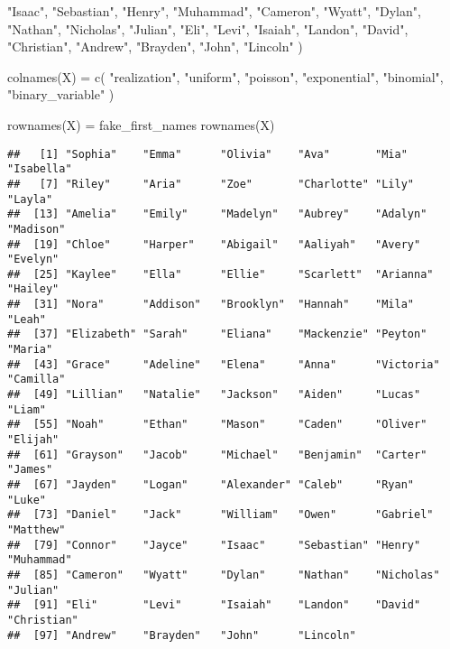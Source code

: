 \documentclass[
]{article}
\newenvironment{Shaded}{\begin{snugshade}}{\end{snugshade}}
\newcommand{\FunctionTok}[1]{\textcolor[rgb]{0.00,0.00,0.00}{#1}}
\newcommand{\NormalTok}[1]{#1}
\newcommand{\OtherTok}[1]{\textcolor[rgb]{0.56,0.35,0.01}{#1}}
\newcommand{\StringTok}[1]{\textcolor[rgb]{0.31,0.60,0.02}{#1}}
\begin{document}
\begin{Shaded}
\begin{Highlighting}[]
  \StringTok{"Isaac"}\NormalTok{, }\StringTok{"Sebastian"}\NormalTok{, }\StringTok{"Henry"}\NormalTok{, }\StringTok{"Muhammad"}\NormalTok{, }\StringTok{"Cameron"}\NormalTok{, }\StringTok{"Wyatt"}\NormalTok{, }
  \StringTok{"Dylan"}\NormalTok{, }\StringTok{"Nathan"}\NormalTok{, }\StringTok{"Nicholas"}\NormalTok{, }\StringTok{"Julian"}\NormalTok{, }\StringTok{"Eli"}\NormalTok{, }\StringTok{"Levi"}\NormalTok{, }\StringTok{"Isaiah"}\NormalTok{, }
  \StringTok{"Landon"}\NormalTok{, }\StringTok{"David"}\NormalTok{, }\StringTok{"Christian"}\NormalTok{, }\StringTok{"Andrew"}\NormalTok{, }\StringTok{"Brayden"}\NormalTok{, }\StringTok{"John"}\NormalTok{, }
  \StringTok{"Lincoln"}
\NormalTok{)}

\FunctionTok{colnames}\NormalTok{(X) }\OtherTok{=} \FunctionTok{c}\NormalTok{(}
  \StringTok{"realization"}\NormalTok{,}
  \StringTok{"uniform"}\NormalTok{,}
  \StringTok{"poisson"}\NormalTok{,}
  \StringTok{"exponential"}\NormalTok{,}
  \StringTok{"binomial"}\NormalTok{,}
  \StringTok{"binary\_variable"}
\NormalTok{)}


\FunctionTok{rownames}\NormalTok{(X) }\OtherTok{=}\NormalTok{ fake\_first\_names}
\FunctionTok{rownames}\NormalTok{(X)}
\end{Highlighting}
\end{Shaded}

\begin{verbatim}
##   [1] "Sophia"    "Emma"      "Olivia"    "Ava"       "Mia"       "Isabella" 
##   [7] "Riley"     "Aria"      "Zoe"       "Charlotte" "Lily"      "Layla"    
##  [13] "Amelia"    "Emily"     "Madelyn"   "Aubrey"    "Adalyn"    "Madison"  
##  [19] "Chloe"     "Harper"    "Abigail"   "Aaliyah"   "Avery"     "Evelyn"   
##  [25] "Kaylee"    "Ella"      "Ellie"     "Scarlett"  "Arianna"   "Hailey"   
##  [31] "Nora"      "Addison"   "Brooklyn"  "Hannah"    "Mila"      "Leah"     
##  [37] "Elizabeth" "Sarah"     "Eliana"    "Mackenzie" "Peyton"    "Maria"    
##  [43] "Grace"     "Adeline"   "Elena"     "Anna"      "Victoria"  "Camilla"  
##  [49] "Lillian"   "Natalie"   "Jackson"   "Aiden"     "Lucas"     "Liam"     
##  [55] "Noah"      "Ethan"     "Mason"     "Caden"     "Oliver"    "Elijah"   
##  [61] "Grayson"   "Jacob"     "Michael"   "Benjamin"  "Carter"    "James"    
##  [67] "Jayden"    "Logan"     "Alexander" "Caleb"     "Ryan"      "Luke"     
##  [73] "Daniel"    "Jack"      "William"   "Owen"      "Gabriel"   "Matthew"  
##  [79] "Connor"    "Jayce"     "Isaac"     "Sebastian" "Henry"     "Muhammad" 
##  [85] "Cameron"   "Wyatt"     "Dylan"     "Nathan"    "Nicholas"  "Julian"   
##  [91] "Eli"       "Levi"      "Isaiah"    "Landon"    "David"     "Christian"
##  [97] "Andrew"    "Brayden"   "John"      "Lincoln"
\end{verbatim}
\end{document}
